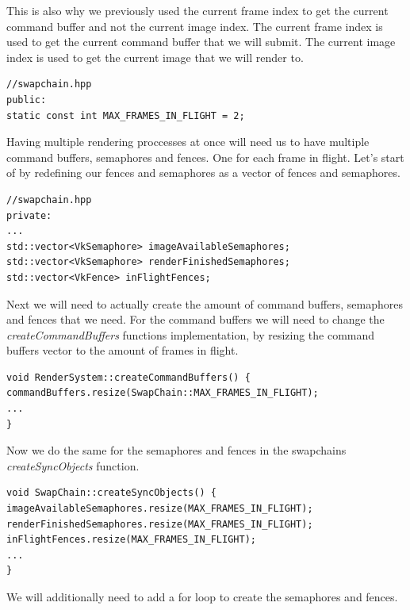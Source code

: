 \documentclass[12pt]{report} \usepackage{preamble}
\begin{document}
This is also why we previously used the current frame index to get the current command buffer and not the current image index. The current
frame index is used to get the current command buffer that we will submit. The current image index is used to get the current image that
we will render to.

\begin{lstlisting}[Language=C++]
//swapchain.hpp
public:
static const int MAX_FRAMES_IN_FLIGHT = 2;
\end{lstlisting}

Having multiple rendering proccesses at once will need us to have multiple command buffers, semaphores and fences.
One for each frame in flight. Let's start of by redefining our fences and semaphores as a vector of fences and semaphores.

\begin{lstlisting}[Language=C++]
//swapchain.hpp
private:
...
std::vector<VkSemaphore> imageAvailableSemaphores;
std::vector<VkSemaphore> renderFinishedSemaphores;
std::vector<VkFence> inFlightFences;
\end{lstlisting}

Next we will need to actually create the amount of command buffers, semaphores and fences that we need. For the
command buffers we will need to change the \textit{createCommandBuffers} functions implementation, by resizing the command buffers
vector to the amount of frames in flight.

\begin{lstlisting}[Language=C++]
void RenderSystem::createCommandBuffers() {
commandBuffers.resize(SwapChain::MAX_FRAMES_IN_FLIGHT);
...
}
\end{lstlisting}

Now we do the same for the semaphores and fences in the swapchains \textit{createSyncObjects} function.

\begin{lstlisting}[Language=C++]
void SwapChain::createSyncObjects() {
imageAvailableSemaphores.resize(MAX_FRAMES_IN_FLIGHT);
renderFinishedSemaphores.resize(MAX_FRAMES_IN_FLIGHT);
inFlightFences.resize(MAX_FRAMES_IN_FLIGHT);
...
}
\end{lstlisting}

We will additionally need to add a for loop to create the semaphores and fences.
\end{document}
